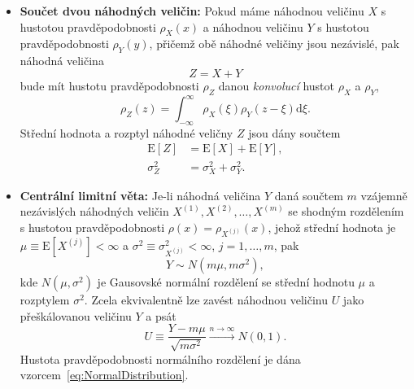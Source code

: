 \documentclass[a4paper,11pt,twoside]{article}
\renewcommand{\d}{\mathrm{d}}           %
\def\expectation#1{\mathrm{E}\left[#1\right]}
\def\dispersion#1{\sigma_{#1}^{2}}
\theoremstyle{red}
\theoremstyle{green}
\begin{document}
\begin{itemize}
            \item {\bf Součet dvou náhodných veličin:} 
                Pokud máme náhodnou veličinu $X$ s hustotou pravděpodobnosti $\rho_{X}(x)$ a náhodnou veličinu $Y$ s hustotou pravděpodobnosti $\rho_{Y}(y)$, přičemž obě náhodné veličiny jsou nezávislé, pak náhodná veličina
                \begin{equation}
                    Z=X+Y
                \end{equation}
                bude mít hustotu pravděpodobnosti $\rho_{Z}$ danou \emph{konvolucí} hustot $\rho_{X}$ a $\rho_{Y}$,
                \begin{equation}
                    \label{eq:SumDensity}
                    \rho_{Z}(z)=\int_{-\infty}^{\infty}\rho_{X}(\xi)\rho_{Y}(z-\xi)\d\xi.
                \end{equation}
                Střední hodnota a rozptyl náhodné veličny $Z$ jsou dány součtem 
                \begin{align}
                    \expectation{Z}&=\expectation{X}+\expectation{Y},\nonumber\\
                    \dispersion{Z}&=\dispersion{X}+\dispersion{Y}.
                \end{align}

            \item {\bf Centrální limitní věta:}
                Je-li náhodná veličina $Y$ daná součtem $m$ vzájemně nezávislých náhodných veličin $X^{(1)},X^{(2)},\dotsc,X^{(m)}$ se shodným rozdělením s hustotou pravděpodobnosti $\rho(x)=\rho_{X^{(j)}}(x)$, jehož střední hodnota je $\mu\equiv\expectation{X^{(j)}}<\infty$ a $\sigma^{2}\equiv\dispersion{X^{(j)}}<\infty$, $j=1,\dotsc,m$,
                pak 
                \begin{equation}
                    \label{eq:CLT}
                    Y\sim N(m\mu,m\sigma^{2}),
                \end{equation}
                kde $N(\mu,\sigma^{2})$ je Gausovské normální rozdělení se střední hodnotu $\mu$ a rozptylem $\sigma^{2}$.
                Zcela ekvivalentně lze zavést náhodnou veličinu $U$ jako přeškálovanou veličinu $Y$ a psát
                \begin{equation}
                    \label{eq:CLT1}
                    U\equiv\frac{Y-m\mu}{\sqrt{m\sigma^{2}}}\xrightarrow{n\rightarrow\infty}N(0,1).
                \end{equation}
                Hustota pravděpodobnosti normálního rozdělení je dána vzorcem~\eqref{eq:NormalDistribution}.
        \end{itemize}
\end{document}
